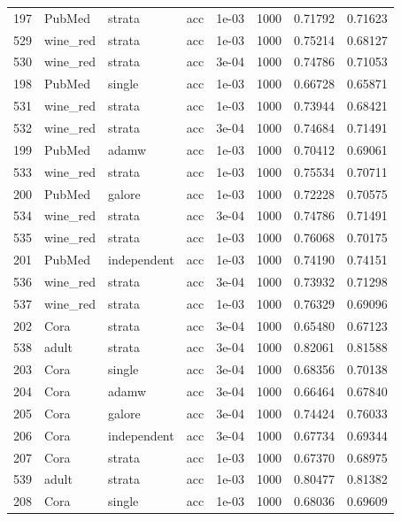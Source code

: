 \begin{longtable}{rlllrrrr}
\rowcolor{oursbg}
197 & PubMed & strata & acc & 1e-03 & 1000 & 0.71792 & 0.71623 \\
529 & wine\_red & strata & acc & 1e-03 & 1000 & 0.75214 & 0.68127 \\
\rowcolor{oursbg}
530 & wine\_red & strata & acc & 3e-04 & 1000 & 0.74786 & 0.71053 \\
198 & PubMed & single & acc & 1e-03 & 1000 & 0.66728 & 0.65871 \\
\rowcolor{oursbg}
531 & wine\_red & strata & acc & 1e-03 & 1000 & 0.73944 & 0.68421 \\
532 & wine\_red & strata & acc & 3e-04 & 1000 & 0.74684 & 0.71491 \\
199 & PubMed & adamw & acc & 1e-03 & 1000 & 0.70412 & 0.69061 \\
\rowcolor{oursbg}
533 & wine\_red & strata & acc & 1e-03 & 1000 & 0.75534 & 0.70711 \\
200 & PubMed & galore & acc & 1e-03 & 1000 & 0.72228 & 0.70575 \\
\rowcolor{oursbg}
534 & wine\_red & strata & acc & 3e-04 & 1000 & 0.74786 & 0.71491 \\
535 & wine\_red & strata & acc & 1e-03 & 1000 & 0.76068 & 0.70175 \\
201 & PubMed & independent & acc & 1e-03 & 1000 & 0.74190 & 0.74151 \\
\rowcolor{oursbg}
536 & wine\_red & strata & acc & 3e-04 & 1000 & 0.73932 & 0.71298 \\
537 & wine\_red & strata & acc & 1e-03 & 1000 & 0.76329 & 0.69096 \\
\rowcolor{oursbg}
202 & Cora & strata & acc & 3e-04 & 1000 & 0.65480 & 0.67123 \\
538 & adult & strata & acc & 3e-04 & 1000 & 0.82061 & 0.81588 \\
203 & Cora & single & acc & 3e-04 & 1000 & 0.68356 & 0.70138 \\
204 & Cora & adamw & acc & 3e-04 & 1000 & 0.66464 & 0.67840 \\
205 & Cora & galore & acc & 3e-04 & 1000 & 0.74424 & 0.76033 \\
206 & Cora & independent & acc & 3e-04 & 1000 & 0.67734 & 0.69344 \\
\rowcolor{oursbg}
207 & Cora & strata & acc & 1e-03 & 1000 & 0.67370 & 0.68975 \\
539 & adult & strata & acc & 1e-03 & 1000 & 0.80477 & 0.81382 \\
208 & Cora & single & acc & 1e-03 & 1000 & 0.68036 & 0.69609 \\

\end{longtable}
